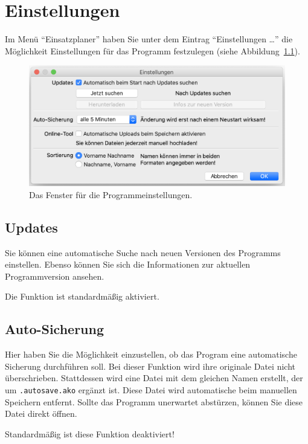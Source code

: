 \chapter{Einstellungen}\label{einstellungen}
Im Menü "`Einsatzplaner"' haben Sie unter dem Eintrag "`Einstellungen \dots"' die Möglichkeit Einstellungen für das Programm festzulegen (siehe Abbildung~\ref{fig:einstellungen}).
\begin{figure}[!h]
	\includegraphics[width=\textwidth]{img/einstellungen}
	\caption{Das Fenster für die Programmeinstellungen.}
	\label{fig:einstellungen}
\end{figure}



\section{Updates}
Sie können eine automatische Suche nach neuen Versionen des Programms einstellen.
Ebenso können Sie sich die Informationen zur aktuellen Programmversion ansehen.

Die Funktion ist standardmäßig aktiviert.



\section{Auto-Sicherung}
Hier haben Sie die Möglichkeit einzustellen, ob das Program eine automatische Sicherung durchführen soll.
Bei dieser Funktion wird ihre originale Datei nicht überschrieben.
Stattdessen wird eine Datei mit dem gleichen Namen erstellt, der um \texttt{.autosave.ako} ergänzt ist.
Diese Datei wird automatische beim manuellen Speichern entfernt.
Sollte das Programm unerwartet abstürzen, können Sie diese Datei direkt öffnen.

Standardmäßig ist diese Funktion deaktiviert!



